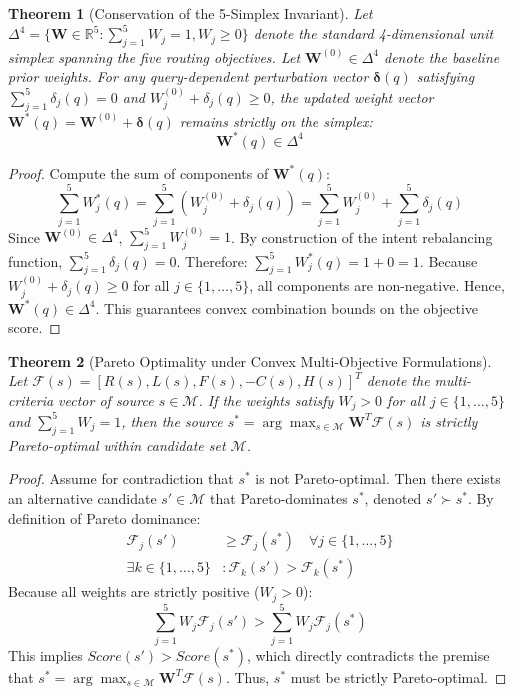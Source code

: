 \documentclass[fleqn,10pt]{article}
\newtheorem{theorem}{Theorem}
\begin{document}
\begin{theorem}[Conservation of the 5-Simplex Invariant]
\label{thm:simplex}
Let $\Delta^4 = \{\mathbf{W} \in \mathbb{R}^5 : \sum_{j=1}^5 W_j = 1, W_j \ge 0\}$ denote the standard 4-dimensional unit simplex spanning the five routing objectives. Let $\mathbf{W}^{(0)} \in \Delta^4$ denote the baseline prior weights. For any query-dependent perturbation vector $\boldsymbol{\delta}(q)$ satisfying $\sum_{j=1}^5 \delta_j(q) = 0$ and $W_j^{(0)} + \delta_j(q) \ge 0$, the updated weight vector $\mathbf{W}^*(q) = \mathbf{W}^{(0)} + \boldsymbol{\delta}(q)$ remains strictly on the simplex:
\begin{equation}
\mathbf{W}^*(q) \in \Delta^4
\end{equation}
\end{theorem}

\begin{proof}
Compute the sum of components of $\mathbf{W}^*(q)$:
\begin{equation}
\sum_{j=1}^5 W_j^*(q) = \sum_{j=1}^5 (W_j^{(0)} + \delta_j(q)) = \sum_{j=1}^5 W_j^{(0)} + \sum_{j=1}^5 \delta_j(q)
\end{equation}
Since $\mathbf{W}^{(0)} \in \Delta^4$, $\sum_{j=1}^5 W_j^{(0)} = 1$. By construction of the intent rebalancing function, $\sum_{j=1}^5 \delta_j(q) = 0$. Therefore:
$\sum_{j=1}^5 W_j^*(q) = 1 + 0 = 1$.
Because $W_j^{(0)} + \delta_j(q) \ge 0$ for all $j \in \{1, \dots, 5\}$, all components are non-negative. Hence, $\mathbf{W}^*(q) \in \Delta^4$. This guarantees convex combination bounds on the objective score.
\end{proof}

\begin{theorem}[Pareto Optimality under Convex Multi-Objective Formulations]
\label{thm:pareto}
Let $\mathcal{F}(s) = [R(s), L(s), F(s), -C(s), H(s)]^T$ denote the multi-criteria vector of source $s \in \mathcal{M}$. If the weights satisfy $W_j > 0$ for all $j \in \{1, \dots, 5\}$ and $\sum_{j=1}^5 W_j = 1$, then the source $s^* = \arg\max_{s \in \mathcal{M}} \mathbf{W}^T \mathcal{F}(s)$ is strictly Pareto-optimal within candidate set $\mathcal{M}$.
\end{theorem}

\begin{proof}
Assume for contradiction that $s^*$ is not Pareto-optimal. Then there exists an alternative candidate $s' \in \mathcal{M}$ that Pareto-dominates $s^*$, denoted $s' \succ s^*$. By definition of Pareto dominance:
\begin{align}
\mathcal{F}_j(s') &\ge \mathcal{F}_j(s^*) \quad \forall j \in \{1, \dots, 5\} \\
\exists k \in \{1, \dots, 5\} &: \mathcal{F}_k(s') > \mathcal{F}_k(s^*)
\end{align}
Because all weights are strictly positive ($W_j > 0$):
\begin{equation}
\sum_{j=1}^5 W_j \mathcal{F}_j(s') > \sum_{j=1}^5 W_j \mathcal{F}_j(s^*)
\end{equation}
This implies $Score(s') > Score(s^*)$, which directly contradicts the premise that $s^* = \arg\max_{s \in \mathcal{M}} \mathbf{W}^T \mathcal{F}(s)$. Thus, $s^*$ must be strictly Pareto-optimal.
\end{proof}
\end{document}
